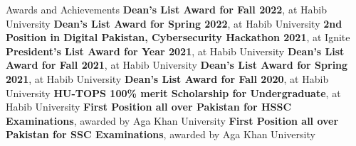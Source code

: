 \begin{rubric}{Awards and Achievements}
\entry*\textbf{Dean's List Award for Fall 2022}, at Habib University
\entry*\textbf{Dean's List Award for Spring 2022}, at Habib University
\entry*\textbf{2nd Position in Digital Pakistan, Cybersecurity Hackathon 2021}, at Ignite
\entry*\textbf{President's List Award for Year 2021}, at Habib University
\entry*\textbf{Dean's List Award for Fall 2021}, at Habib University
\entry*\textbf{Dean's List Award for Spring 2021}, at Habib University
\entry*\textbf{Dean's List Award for Fall 2020}, at Habib University
\entry*\textbf{HU-TOPS 100\% merit Scholarship for Undergraduate}, at Habib University
\entry*\textbf{First Position all over Pakistan for HSSC Examinations}, awarded by Aga Khan University
\entry*\textbf{First Position all over Pakistan for SSC Examinations}, awarded by Aga Khan University
\end{rubric}
